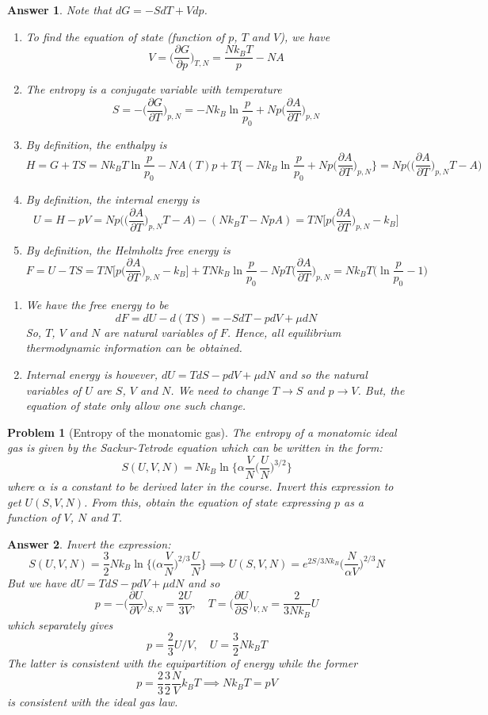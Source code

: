 \documentclass[a4paper]{article}
\newtheorem{ans}{Answer}[section]
\theoremstyle{new}
\newtheorem{qns}{Problem}[section]
\begin{document}
\begin{ans}
Note that $dG=-SdT+Vdp$.
\begin{enumerate}[label=(\alph*)]
\item To find the equation of state (function of $p$, $T$ and $V$), we have
$$V=\bigg(\frac{\partial G}{\partial p}\bigg)_{T,N}=\frac{Nk_BT}{p}-NA$$
\item The entropy is a conjugate variable with temperature
$$S=-\bigg(\frac{\partial G}{\partial T}\bigg)_{p,N}=-Nk_B\ln\frac{p}{p_0}+Np\bigg(\frac{\partial A}{\partial T}\bigg)_{p,N}$$
\item By definition, the enthalpy is
$$H=G+TS=Nk_BT\ln\frac{p}{p_0}-NA(T)p+T\bigg\{-Nk_B\ln\frac{p}{p_0}+Np\bigg(\frac{\partial A}{\partial T}\bigg)_{p,N}\bigg\}=Np\bigg(\bigg(\frac{\partial A}{\partial T}\bigg)_{p,N}T-A\bigg)$$
\item By definition, the internal energy is
$$U=H-pV=Np\bigg(\bigg(\frac{\partial A}{\partial T}\bigg)_{p,N}T-A\bigg)-(Nk_BT-NpA)=TN\bigg[p\bigg(\frac{\partial A}{\partial T}\bigg)_{p,N}-k_B\bigg]$$
\item By definition, the Helmholtz free energy is
$$F=U-TS=TN\bigg[p\bigg(\frac{\partial A}{\partial T}\bigg)_{p,N}-k_B\bigg]+TNk_B\ln\frac{p}{p_0}-NpT\bigg(\frac{\partial A}{\partial T}\bigg)_{p,N}=Nk_BT\bigg(\ln\frac{p}{p_0}-1\bigg)$$
\end{enumerate}
\begin{enumerate}[label=\roman*]
\item We have the free energy to be
$$dF=dU-d(TS)=-SdT-pdV+\mu dN$$
So, $T$, $V$ and $N$ are natural variables of $F$. Hence, all equilibrium thermodynamic information can be obtained.
\item Internal energy is however, $dU=TdS-pdV+\mu dN$ and so the natural variables of $U$ are $S$, $V$ and $N$. We need to change $T\rightarrow S$ and $p\rightarrow V$. But, the equation of state only allow one such change.
\end{enumerate}
\end{ans}
\begin{qns}[Entropy of the monatomic gas]
The entropy of a monatomic ideal gas is given by the Sackur-Tetrode equation which can be written in the form:
$$S(U,V,N)=Nk_B\ln\bigg\{\alpha\frac{V}{N}\bigg(\frac{U}{N}\bigg)^{3/2}\bigg\}$$
where $\alpha$ is a constant to be derived later in the course. Invert this expression to get $U(S, V, N)$. From this, obtain the equation of state expressing $p$ as a function of $V$, $N$ and $T$.
\end{qns}
\begin{ans}
Invert the expression:
$$S(U,V,N)=\frac{3}{2}Nk_B\ln\bigg\{\bigg(\alpha\frac{V}{N}\bigg)^{2/3}\frac{U}{N}\bigg\}\implies U(S,V,N)=e^{2S/3Nk_B}\bigg(\frac{N}{\alpha V}\bigg)^{2/3}N$$
But we have $dU=TdS-pdV+\mu dN$ and so
$$p=-\bigg(\frac{\partial U}{\partial V}\bigg)_{S,N}=\frac{2U}{3V},\quad T=\bigg(\frac{\partial U}{\partial S}\bigg)_{V,N}=\frac{2}{3Nk_B}U$$
which separately gives 
$$p=\frac{2}{3}U/V,\quad U=\frac{3}{2}Nk_BT$$
The latter is consistent with the equipartition of energy while the former
$$p=\frac{2}{3}\frac{3}{2}\frac{N}{V}k_BT\implies Nk_BT=pV$$
is consistent with the ideal gas law.
\end{ans}
\end{document}
